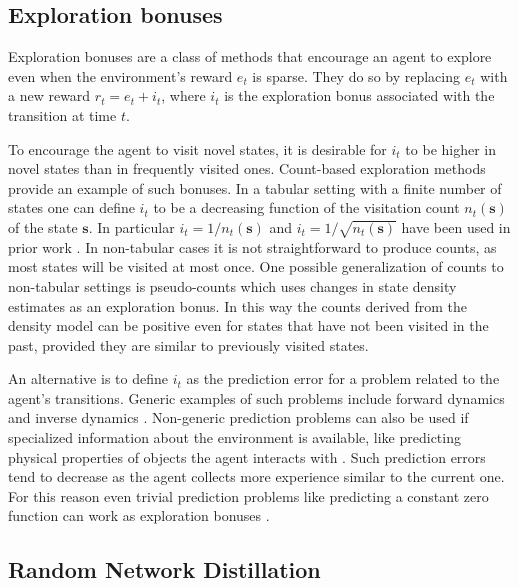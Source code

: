 \documentclass{article} %
\begin{document}
\subsection{Exploration bonuses}
\label{sec:method}
Exploration bonuses are a class of methods that encourage an agent to explore even when the environment's reward $e_t$ is sparse. They do so by replacing $e_t$ with a new reward $r_t=e_t+i_t$, where $i_t$ is the exploration bonus associated with the transition at time $t$.

To encourage the agent to visit novel states, it is desirable for $i_t$ to be higher in novel states than in frequently visited ones. Count-based exploration methods provide an example of such bonuses. In a tabular setting with a finite number of states one can define $i_t$ to be a decreasing function of the visitation count $n_t({\bm{s}})$ of the state ${\bm{s}}$. In particular $i_t = 1/n_t({\bm{s}})$ and $i_t = 1/\sqrt{n_t({\bm{s}})}$ have been used in prior work \citep{bellemare2016unifying, neuralcount}. In non-tabular cases it is not straightforward to produce counts, as most states will be visited at most once. One possible generalization of counts to non-tabular settings is pseudo-counts \citep{bellemare2016unifying} which uses changes in state density estimates as an exploration bonus. In this way the counts derived from the density model can be positive even for states that have not been visited in the past, provided they are similar to previously visited states.

An alternative is to define $i_t$ as the prediction error for a problem related to the agent's transitions. Generic examples of such problems include forward dynamics \citep{schmidhuber_curiosity,stadie2015incentivizing,josh_surprise,pathakICMl17curiosity,burda18largescale} and inverse dynamics \citep{haber2018learning}. Non-generic prediction problems can also be used if specialized information about the environment is available, like predicting physical properties of objects the agent interacts with \citep{denil2016learning}. Such prediction errors tend to decrease as the agent collects more experience similar to the current one. For this reason even trivial prediction problems like predicting a constant zero function can work as exploration bonuses \citep{fox2018dora}.

\subsection{Random Network Distillation}
\end{document}
